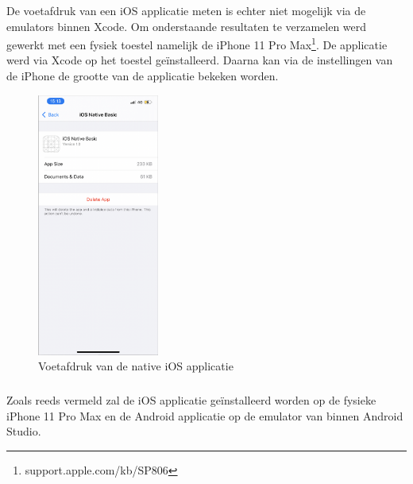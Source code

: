 \subsubsection{}
\label{sec:M-test-voetafdruk-ios}
De voetafdruk van een iOS applicatie meten is echter niet mogelijk via de emulators binnen Xcode. Om onderstaande resultaten te verzamelen werd gewerkt met een fysiek toestel namelijk de iPhone 11 Pro Max\footnote{support.apple.com/kb/SP806}. De applicatie werd via Xcode op het toestel geïnstalleerd. Daarna kan via de instellingen van de iPhone de grootte van de applicatie bekeken worden.

\begin{figure}
    \centering
    \includegraphics[width=4cm]{img/voetafdruk-i-native}
    \caption{Voetafdruk van de native iOS applicatie}
    \label{fig:M-voetafdruk-ios}
\end{figure}


\subsubsection{}
\label{sec:M-test-voetafdruk-kmm}
Zoals reeds vermeld zal de iOS applicatie geïnstalleerd worden op de fysieke iPhone 11 Pro Max en de Android applicatie op de emulator van binnen Android Studio.

